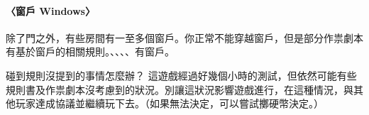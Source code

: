 \paragraph{〈窗戶 Windows〉}
除了門之外，有些房間有一至多個窗戶。你正常不能穿越窗戶，但是部分作祟劇本有基於窗戶的相關規則。、、、、有窗戶。

\begin{RuleBox}{碰到規則沒提到的事情怎麼辦？}
	這遊戲經過好幾個小時的測試，但依然可能有些規則書及作祟劇本沒考慮到的狀況。別讓這狀況影響遊戲進行，在這種情況，與其他玩家達成協議並繼續玩下去。（如果無法決定，可以嘗試擲硬幣決定。）
\end{RuleBox}
